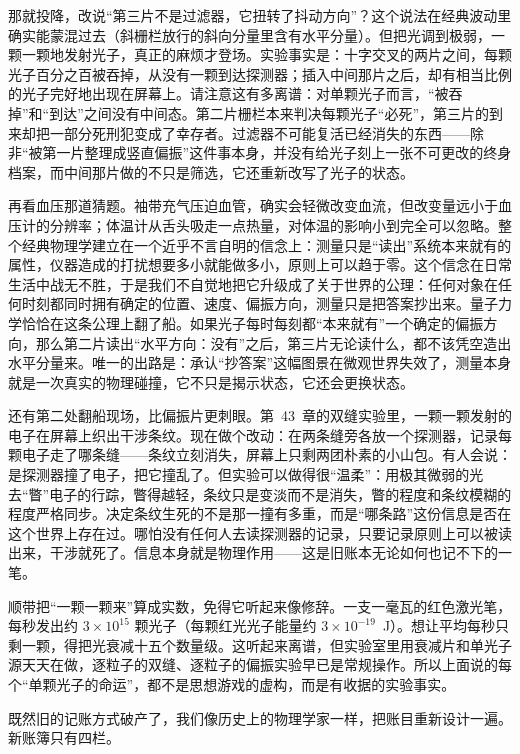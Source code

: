 那就投降，改说“第三片不是过滤器，它扭转了抖动方向”？这个说法在经典波动里确实能蒙混过去（斜栅栏放行的斜向分量里含有水平分量）。但把光调到极弱，一颗一颗地发射光子，真正的麻烦才登场。实验事实是：十字交叉的两片之间，每颗光子百分之百被吞掉，从没有一颗到达探测器；插入中间那片之后，却有相当比例的光子完好地出现在屏幕上。请注意这有多离谱：对单颗光子而言，“被吞掉”和“到达”之间没有中间态。第二片栅栏本来判决每颗光子“必死”，第三片的到来却把一部分死刑犯变成了幸存者。过滤器不可能复活已经消失的东西——除非“被第一片整理成竖直偏振”这件事本身，并没有给光子刻上一张不可更改的终身档案，而中间那片做的不只是筛选，它还重新改写了光子的状态。

再看血压那道猜题。袖带充气压迫血管，确实会轻微改变血流，但改变量远小于血压计的分辨率；体温计从舌头吸走一点热量，对体温的影响小到完全可以忽略。整个经典物理学建立在一个近乎不言自明的信念上：测量只是“读出”系统本来就有的属性，仪器造成的打扰想要多小就能做多小，原则上可以趋于零。这个信念在日常生活中战无不胜，于是我们不自觉地把它升级成了关于世界的公理：任何对象在任何时刻都同时拥有确定的位置、速度、偏振方向，测量只是把答案抄出来。量子力学恰恰在这条公理上翻了船。如果光子每时每刻都“本来就有”一个确定的偏振方向，那么第二片读出“水平方向：没有”之后，第三片无论读什么，都不该凭空造出水平分量来。唯一的出路是：承认“抄答案”这幅图景在微观世界失效了，测量本身就是一次真实的物理碰撞，它不只是揭示状态，它还会更换状态。

还有第二处翻船现场，比偏振片更刺眼。第~43~章的双缝实验里，一颗一颗发射的电子在屏幕上织出干涉条纹。现在做个改动：在两条缝旁各放一个探测器，记录每颗电子走了哪条缝——条纹立刻消失，屏幕上只剩两团朴素的小山包。有人会说：是探测器撞了电子，把它撞乱了。但实验可以做得很“温柔”：用极其微弱的光去“瞥”电子的行踪，瞥得越轻，条纹只是变淡而不是消失，瞥的程度和条纹模糊的程度严格同步。决定条纹生死的不是那一撞有多重，而是“哪条路”这份信息是否在这个世界上存在过。哪怕没有任何人去读探测器的记录，只要记录原则上可以被读出来，干涉就死了。信息本身就是物理作用——这是旧账本无论如何也记不下的一笔。

顺带把“一颗一颗来”算成实数，免得它听起来像修辞。一支一毫瓦的红色激光笔，每秒发出约 $3\times10^{15}$ 颗光子（每颗红光光子能量约 $3\times10^{-19}$~J）。想让平均每秒只剩一颗，得把光衰减十五个数量级。这听起来离谱，但实验室里用衰减片和单光子源天天在做，逐粒子的双缝、逐粒子的偏振实验早已是常规操作。所以上面说的每个“单颗光子的命运”，都不是思想游戏的虚构，而是有收据的实验事实。


既然旧的记账方式破产了，我们像历史上的物理学家一样，把账目重新设计一遍。新账簿只有四栏。

